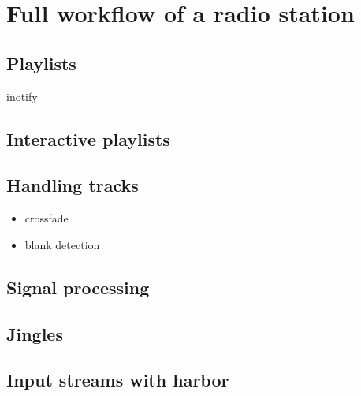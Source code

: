 \chapter{Full workflow of a radio station}
\section{Playlists}

inotify

\section{Interactive playlists}

\section{Handling tracks}
\begin{itemize}
\item crossfade
\item blank detection
\end{itemize}

\section{Signal processing}

\section{Jingles}

\section{Input streams with harbor}
